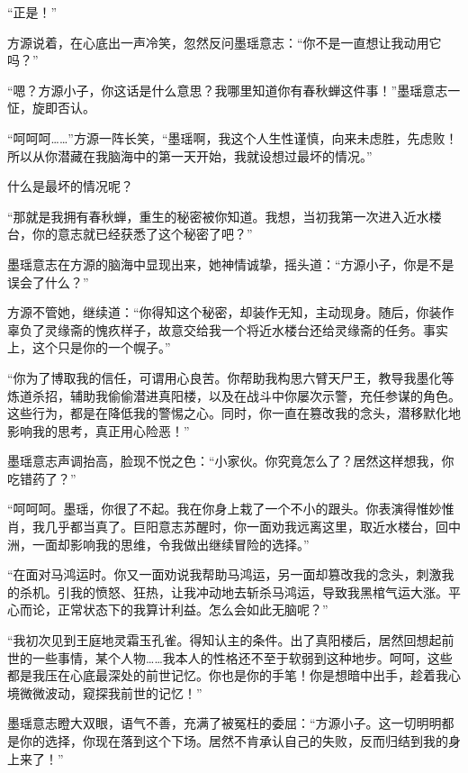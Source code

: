 
\begin{this_body}



“正是！”

方源说着，在心底出一声冷笑，忽然反问墨瑶意志：“你不是一直想让我动用它吗？”

“嗯？方源小子，你这话是什么意思？我哪里知道你有春秋蝉这件事！”墨瑶意志一怔，旋即否认。

“呵呵呵……”方源一阵长笑，“墨瑶啊，我这个人生性谨慎，向来未虑胜，先虑败！所以从你潜藏在我脑海中的第一天开始，我就设想过最坏的情况。”

什么是最坏的情况呢？

“那就是我拥有春秋蝉，重生的秘密被你知道。我想，当初我第一次进入近水楼台，你的意志就已经获悉了这个秘密了吧？”

墨瑶意志在方源的脑海中显现出来，她神情诚挚，摇头道：“方源小子，你是不是误会了什么？”

方源不管她，继续道：“你得知这个秘密，却装作无知，主动现身。随后，你装作辜负了灵缘斋的愧疚样子，故意交给我一个将近水楼台还给灵缘斋的任务。事实上，这个只是你的一个幌子。”

“你为了博取我的信任，可谓用心良苦。你帮助我构思六臂天尸王，教导我墨化等炼道杀招，辅助我偷偷潜进真阳楼，以及在战斗中你屡次示警，充任参谋的角色。这些行为，都是在降低我的警惕之心。同时，你一直在篡改我的念头，潜移默化地影响我的思考，真正用心险恶！”

墨瑶意志声调抬高，脸现不悦之色：“小家伙。你究竟怎么了？居然这样想我，你吃错药了？”

“呵呵呵。墨瑶，你很了不起。我在你身上栽了一个不小的跟头。你表演得惟妙惟肖，我几乎都当真了。巨阳意志苏醒时，你一面劝我远离这里，取近水楼台，回中洲，一面却影响我的思维，令我做出继续冒险的选择。”

“在面对马鸿运时。你又一面劝说我帮助马鸿运，另一面却篡改我的念头，刺激我的杀机。引我的愤怒、狂热，让我冲动地去斩杀马鸿运，导致我黑棺气运大涨。平心而论，正常状态下的我算计利益。怎么会如此无脑呢？”

“我初次见到王庭地灵霜玉孔雀。得知认主的条件。出了真阳楼后，居然回想起前世的一些事情，某个人物……我本人的性格还不至于软弱到这种地步。呵呵，这些都是我压在心底最深处的前世记忆。你也是你的手笔！你是想暗中出手，趁着我心境微微波动，窥探我前世的记忆！”

墨瑶意志瞪大双眼，语气不善，充满了被冤枉的委屈：“方源小子。这一切明明都是你的选择，你现在落到这个下场。居然不肯承认自己的失败，反而归结到我的身上来了！”


\end{this_body}
